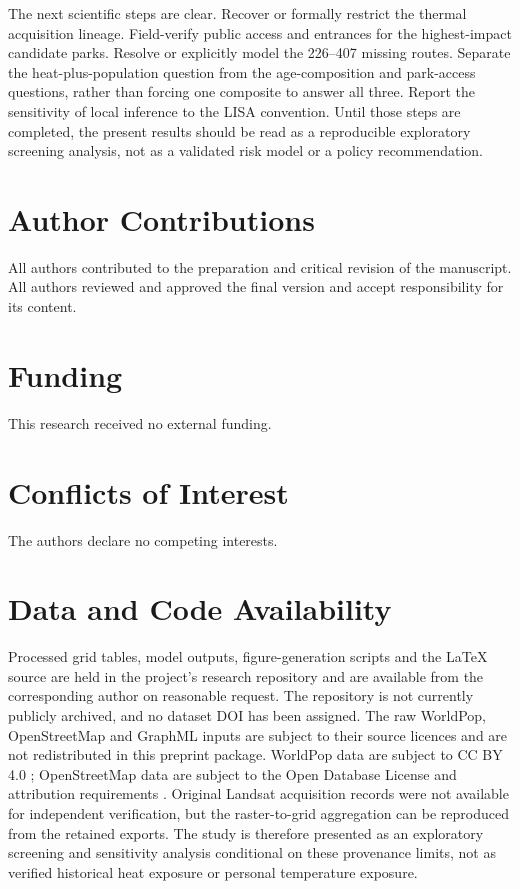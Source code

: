 \documentclass[times,twoside]{_Templates/MultiTargetManuscript}
\begin{document}
The next scientific steps are clear. Recover or formally restrict the thermal
acquisition lineage. Field-verify public access and entrances for the
highest-impact candidate parks. Resolve or explicitly model the 226--407 missing
routes. Separate the heat-plus-population question from the age-composition and
park-access questions, rather than forcing one composite to answer all three.
Report the sensitivity of local inference to the LISA convention. Until those
steps are completed, the present results should be read as a reproducible
exploratory screening analysis, not as a validated risk model or a policy
recommendation.

\section*{Author Contributions}

All authors contributed to the preparation and critical revision of the
manuscript. All authors reviewed and approved the final version and accept
responsibility for its content.

\section*{Funding}

This research received no external funding.

\section*{Conflicts of Interest}

The authors declare no competing interests.

\section*{Data and Code Availability}

Processed grid tables, model outputs, figure-generation scripts and the LaTeX
source are held in the project's research repository and are available from the
corresponding author on reasonable request. The repository is not currently
publicly archived, and no dataset DOI has been assigned. The raw WorldPop,
OpenStreetMap and GraphML inputs are subject to their source licences and are
not redistributed in this preprint package. WorldPop data are subject to CC BY
4.0 \citep{worldpop2025}; OpenStreetMap data are subject to the Open Database
License and attribution requirements \citep{osm2026}. Original Landsat
acquisition records were not available for independent verification, but the
raster-to-grid aggregation can be reproduced from the retained exports. The
study is therefore presented as an exploratory screening and sensitivity
analysis conditional on these provenance limits, not as verified historical
heat exposure or personal temperature exposure.
\end{document}
